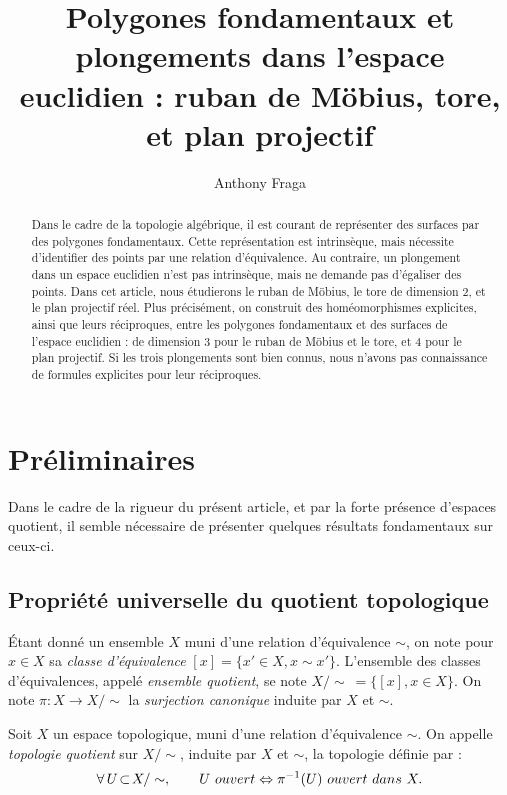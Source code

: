 \documentclass[hidelinks, 10pt]{article}
\title{\textbf{Polygones fondamentaux et plongements dans l'espace euclidien : ruban de Möbius, tore, et plan projectif}}
\author{Anthony Fraga}
\date{}
\begin{document}
\maketitle
\begin{abstract}
Dans le cadre de la topologie algébrique, il est courant de représenter des surfaces par des polygones fondamentaux. Cette représentation est intrinsèque, mais nécessite d'identifier des points par une relation d'équivalence. Au contraire, un plongement dans un espace euclidien n'est pas intrinsèque, mais ne demande pas d'égaliser des points. Dans cet article, nous étudierons le ruban de Möbius, le tore de dimension 2, et le plan projectif réel. Plus précisément, on construit des homéomorphismes explicites, ainsi que leurs réciproques, entre les polygones fondamentaux et des surfaces de l'espace euclidien : de dimension 3 pour le ruban de Möbius et le tore, et 4 pour le plan projectif. Si les trois plongements sont bien connus, nous n'avons pas connaissance de formules explicites pour leur réciproques.
\end{abstract}

\section{Préliminaires}

Dans le cadre de la rigueur du présent article, et par la forte présence d'espaces quotient, il semble nécessaire de présenter quelques résultats fondamentaux sur ceux-ci.

\subsection{Propriété universelle du quotient topologique}

Étant donné un ensemble $X$ muni d'une relation d'équivalence $\sim$, on note pour $x\in X$ sa \emph{classe d'équivalence} $[x]=\{x'\in X, x\sim x'\}$. L'ensemble des classes d'équivalences, appelé \emph{ensemble quotient}, se note $X/\!\sim\ =\{[x],x\in X\}$. On note $\pi:X\to X/\!\sim$ la \emph{surjection canonique} induite par $X$ et $\sim$.

\begin{definition}
Soit $X$ un espace topologique, muni d'une relation d'équivalence $\sim$. On appelle \emph{topologie quotient} sur $X/\!\sim$, induite par $X$ et $\sim$, la topologie définie par :\[\forall\, U\!\subset\! X/\sim,\qquad U\ ouvert\Leftrightarrow\pi\inv(U)\ ouvert\ dans \ X.\]
\end{definition}
\end{document}
